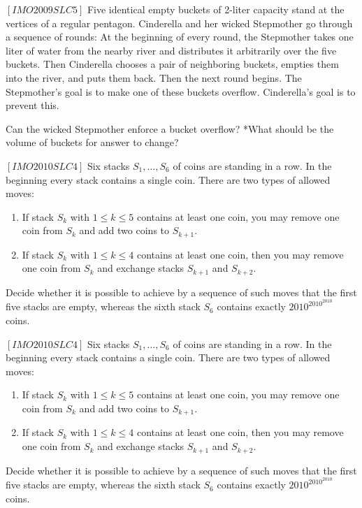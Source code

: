 \begin{problem}
$[IMO2009SLC5]$
Five identical empty buckets of 2-liter capacity stand at the vertices of a regular pentagon. Cinderella and her wicked Stepmother go through a sequence of rounds: At the beginning of every round, the Stepmother takes one liter of water from the nearby river and distributes it arbitrarily over the ﬁve buckets. Then Cinderella chooses a pair of neighboring buckets, empties them into the river, and puts them back. Then the next round begins. The Stepmother’s goal is to make one of these buckets overﬂow. Cinderella’s goal is to prevent this. 

Can the wicked Stepmother enforce a bucket overﬂow?  *What should be the volume of buckets for answer to change?

\end{problem}

\begin{problem}
$[IMO2010SLC4]$
Six stacks $S_1,\dots,S_6$ of coins are standing in a row. In the beginning every stack contains a single coin. There are two types of allowed moves: 
\begin{enumerate}
\item \label{move1} If stack $S_k$ with $1\le k \le 5$ contains at least one coin, you may remove one coin from $S_k$ and add two coins to $S_{k+1}$.
\item If stack $S_k$ with $1 \le k \le 4$ contains at least one coin, then you may remove one coin from $S_k$ and exchange stacks $S_{k+1}$ and $S_{k+2}$. 
 \end{enumerate}
 Decide whether it is possible to achieve by a sequence of such moves that the ﬁrst ﬁve stacks are empty, whereas the sixth stack $S_6$ contains exactly $2010^{2010^{2010}}$ coins.

\end{problem}
\begin{problem}
$[IMO2010SLC4]$
Six stacks $S_1,\dots,S_6$ of coins are standing in a row. In the beginning every stack contains a single coin. There are two types of allowed moves: 
\begin{enumerate}
\item \label{move1} If stack $S_k$ with $1\le k \le 5$ contains at least one coin, you may remove one coin from $S_k$ and add two coins to $S_{k+1}$.
\item If stack $S_k$ with $1 \le k \le 4$ contains at least one coin, then you may remove one coin from $S_k$ and exchange stacks $S_{k+1}$ and $S_{k+2}$. 
 \end{enumerate}
 Decide whether it is possible to achieve by a sequence of such moves that the ﬁrst ﬁve stacks are empty, whereas the sixth stack $S_6$ contains exactly $2010^{2010^{2010}}$ coins.

\end{problem}




